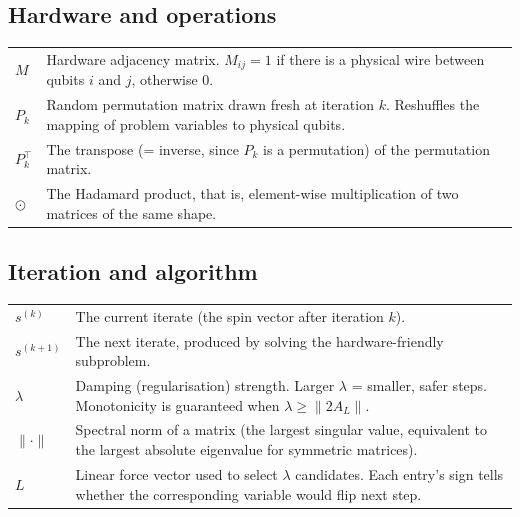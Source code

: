 \documentclass[11pt,a4paper]{article}
\begin{document}
\subsection*{\small\color{accent} Hardware and operations}
\begin{tabular}{@{}p{2.4cm}p{14cm}@{}}
$M$            & Hardware adjacency matrix. $M_{ij}=1$ if there is a physical wire between qubits $i$ and $j$, otherwise $0$. \\
$P_k$          & Random permutation matrix drawn fresh at iteration $k$. Reshuffles the mapping of problem variables to physical qubits. \\
$P_k^{\top}$   & The transpose (= inverse, since $P_k$ is a permutation) of the permutation matrix. \\
$\odot$        & The Hadamard product, that is, element-wise multiplication of two matrices of the same shape. \\
\end{tabular}

\subsection*{\small\color{accent} Iteration and algorithm}
\begin{tabular}{@{}p{2.4cm}p{14cm}@{}}
$s^{(k)}$      & The current iterate (the spin vector after iteration $k$). \\
$s^{(k+1)}$    & The next iterate, produced by solving the hardware-friendly subproblem. \\
$\lambda$      & Damping (regularisation) strength. Larger $\lambda$ = smaller, safer steps. Monotonicity is guaranteed when $\lambda \ge \|2 A_L\|$. \\
$\|\cdot\|$    & Spectral norm of a matrix (the largest singular value, equivalent to the largest absolute eigenvalue for symmetric matrices). \\
$L$            & Linear force vector used to select $\lambda$ candidates. Each entry's sign tells whether the corresponding variable would flip next step. \\
\end{tabular}
\end{document}
